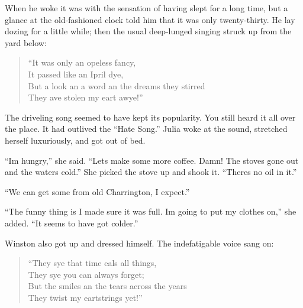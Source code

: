 When he woke it was with the sensation of having slept for a long time,
but a glance at the old-fashioned clock told him that it was only
twenty-thirty. He lay dozing for a little while; then the usual
deep-lunged singing struck up from the yard below:

\begin{quotation}
  ``It was only an \textquotesingle opeless fancy,\\
  It passed like an Ipril dye,\\
  But a look an\textquotesingle{} a word an\textquotesingle{} the
  dreams they stirred\\
  They \textquotesingle ave stolen my \textquotesingle eart awye!''
\end{quotation}

The driveling song seemed to have kept its popularity. You still heard
it all over the place. It had outlived the ``Hate Song.'' Julia woke at
the sound, stretched herself luxuriously, and got out of bed.

``I\textquotesingle m hungry,'' she said. ``Let\textquotesingle s make some
more coffee. Damn! The stove\textquotesingle s gone out and the
water\textquotesingle s cold.'' She picked the stove up and shook it.
``There\textquotesingle s no oil in it.''

``We can get some from old Charrington, I expect.''

``The funny thing is I made sure it was full. I\textquotesingle m going
to put my clothes on,'' she added. ``It seems to have got colder.''

Winston also got up and dressed himself. The indefatigable voice sang
on:

\begin{quotation}
  ``They sye that time \textquotesingle eals all things,\\
  They sye you can always forget;\\
  But the smiles an\textquotesingle{} the tears across the years\\
  They twist my \textquotesingle eartstrings yet!''
\end{quotation}


